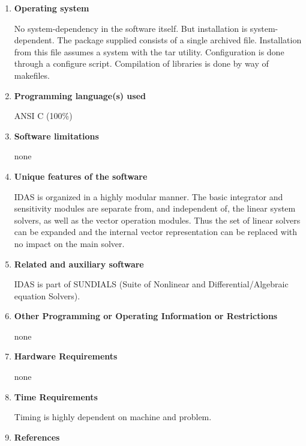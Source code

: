 \documentclass[12pt]{letter}
\begin{document}
\begin{letter}
\begin{enumerate}
\item {\bf Operating system}

No system-dependency in the software itself. But installation is system-dependent. 
The package supplied consists of a single archived file. Installation from this file 
assumes a system with the tar utility. Configuration is done through a 
configure script. Compilation of libraries is done by way of makefiles.

\item {\bf Programming language(s) used}

ANSI C (100\%)

\item {\bf Software limitations}

none

\item {\bf Unique features of the software}

IDAS is organized in a highly modular manner. The basic integrator and 
sensitivity modules are separate from, and independent of, the linear system 
solvers, as well as the vector operation modules. Thus the set of linear solvers can be 
expanded and the internal vector representation can be replaced with no impact on 
the main solver.


\item {\bf Related and auxiliary software}

IDAS is part of SUNDIALS (Suite of Nonlinear and Differential/Algebraic equation Solvers). 

\item {\bf Other Programming or Operating Information or Restrictions}

none


\item {\bf Hardware Requirements}

none


\item {\bf Time Requirements}

Timing is highly dependent on machine and problem.


\item {\bf References}


\end{enumerate}
\end{letter}
\end{document}
